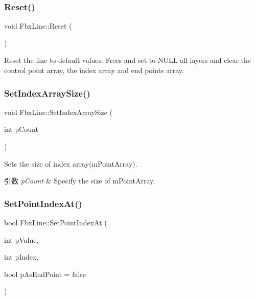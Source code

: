 \subsubsection{\texorpdfstring{Reset()}{Reset()}}
{\footnotesize\ttfamily void Fbx\+Line\+::\+Reset (\begin{DoxyParamCaption}{ }\end{DoxyParamCaption})}

Reset the line to default values. Frees and set to {\ttfamily N\+U\+LL} all layers and clear the control point array, the index array and end points array. \mbox{\label{class_fbx_line_ae954e7ff77330b0da208d727b194bf75}} 
\subsubsection{\texorpdfstring{Set\+Index\+Array\+Size()}{SetIndexArraySize()}}
{\footnotesize\ttfamily void Fbx\+Line\+::\+Set\+Index\+Array\+Size (\begin{DoxyParamCaption}\item[{int}]{p\+Count }\end{DoxyParamCaption})}

Sets the size of index array(m\+Point\+Array). 
\begin{DoxyParams}{引数}
{\em p\+Count} & Specify the size of m\+Point\+Array. \\
\hline
\end{DoxyParams}
\mbox{\label{class_fbx_line_a891629171b278b9ed9f8ebde8acca2b1}} 
\subsubsection{\texorpdfstring{Set\+Point\+Index\+At()}{SetPointIndexAt()}}
{\footnotesize\ttfamily bool Fbx\+Line\+::\+Set\+Point\+Index\+At (\begin{DoxyParamCaption}\item[{int}]{p\+Value,  }\item[{int}]{p\+Index,  }\item[{bool}]{p\+As\+End\+Point = {\ttfamily false} }\end{DoxyParamCaption})}

